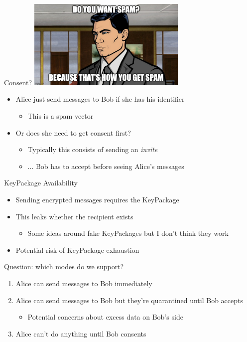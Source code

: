\documentclass[helvetica]{beamer}
\begin{document}
\begin{frame}{Consent?}
  \includegraphics[width=3in]{archer-spam}
  \begin{itemize}
  \item Alice just send messages to Bob if she has his identifier
    \begin{itemize}
    \item This is a spam vector      
    \end{itemize}
  \item Or does she need to get consent first?
    \begin{itemize}
    \item Typically this consists of sending an \emph{invite}
    \item ... Bob has to accept before seeing Alice's messages      
    \end{itemize}
  \end{itemize}
\end{frame}


\begin{frame}{KeyPackage Availability}
  \begin{itemize}
  \item Sending encrypted messages requires the KeyPackage
  \item This leaks whether the recipient exists
    \begin{itemize}
    \item Some ideas around fake KeyPackages but I don't think they work
      \end{itemize}
  \item Potential risk of KeyPackage exhaustion
  \end{itemize}
\end{frame}

\begin{frame}{Question: which modes do we support?}
  \begin{enumerate}
  \item Alice can send messages to Bob immediately    
  \item Alice can send messages to Bob but they're quarantined until Bob accepts
    \begin{itemize}
    \item Potential concerns about excess data on Bob's side      
    \end{itemize}
  \item Alice can't do anything until Bob consents
\end{enumerate}    
\end{frame}
\end{document}
